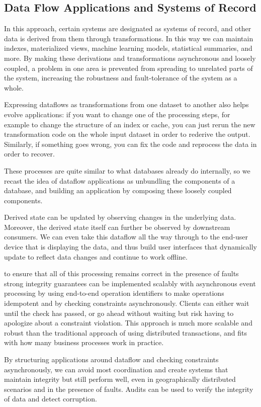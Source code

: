 \documentclass{article}
\begin{document}
    \subsection{Data Flow Applications and Systems of Record }
    In this approach, certain systems are designated as systems of record, and other data is derived from them through transformations. In this way we can maintain indexes, materialized views, machine learning models, statistical summaries, and more. By making these derivations and transformations asynchronous and loosely coupled, a problem in one area is prevented from spreading to unrelated parts of the system, increasing the robustness and fault-tolerance of the system as a whole.

    Expressing dataflows as transformations from one dataset to another also helps evolve applications: if you want to change one of the processing steps, for example to change the structure of an index or cache, you can just rerun the new transformation code on the whole input dataset in order to rederive the output. Similarly, if something goes wrong, you can fix the code and reprocess the data in order to recover.

    These processes are quite similar to what databases already do internally, so we recast the idea of dataflow applications as unbundling the components of a database, and building an application by composing these loosely coupled components.

    Derived state can be updated by observing changes in the underlying data. Moreover, the derived state itself can further be observed by downstream consumers. We can even take this dataflow all the way through to the end-user device that is displaying the data, and thus build user interfaces that dynamically update to reflect data changes and continue to work offline.
    
    to ensure that all of this processing remains correct in the presence of faults strong integrity guarantees can be implemented scalably with asynchronous event processing by using end-to-end operation identifiers to make operations idempotent and by checking constraints asynchronously. Clients can either wait until the check has passed, or go ahead without waiting but risk having to apologize about a constraint violation. This approach is much more scalable and robust than the traditional approach of using distributed transactions, and fits with how many business processes work in practice.
    
    By structuring applications around dataflow and checking constraints asynchronously, we can avoid most coordination and create systems that maintain integrity but still perform well, even in geographically distributed scenarios and in the presence of faults. Audits can be used to verify the integrity of data and detect corruption.
\end{document}

